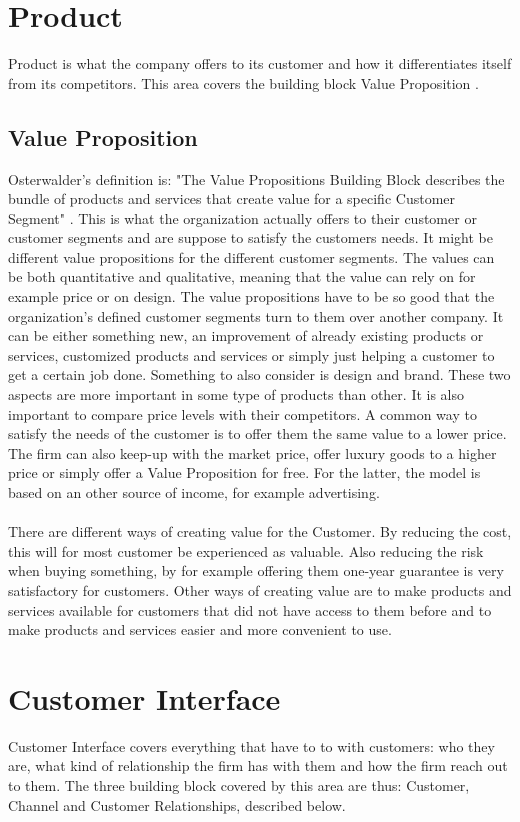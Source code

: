 \newpage
\section{Product}
Product is what the company offers to its customer and how it differentiates itself from its competitors. This area covers the building block Value Proposition \cite{osterwalderthesis}.

\subsection{Value Proposition}
Osterwalder's definition is: "The Value Propositions Building Block describes the bundle of products and services that create value for a specific Customer Segment" \cite{osterwalder}. This is what the organization actually offers to their customer or customer segments and are suppose to satisfy the customers needs. It might be different value propositions for the different customer segments. The values can be both quantitative and qualitative, meaning that the value can rely on for example price or on design. The value propositions have to be so good that the organization's defined customer segments turn to them over another company. It can be either something new, an improvement of already existing products or services, customized products and services or simply just helping a customer to get a certain job done. Something to also consider is design and brand. These two aspects are more important in some type of products than other. It is also important to compare price levels with their competitors. A common way to satisfy the needs of the customer is to offer them the same value to a lower price. The firm can also keep-up with the market price, offer luxury goods to a higher price or simply offer a Value Proposition for free. For the latter, the model is based on an other source of income, for example advertising. \\ \\
There are different ways of creating value for the Customer. By reducing the cost, this will for most customer be experienced as valuable. Also reducing the risk when buying something, by for example offering them one-year guarantee is very satisfactory for customers. Other ways of creating value are to make products and services available for customers that did not have access to them before and to make products and services easier and more convenient to use. \cite{osterwalder}


\section{Customer Interface}
Customer Interface covers everything that have to to with customers: who they are, what kind of relationship the firm has with them and how the firm reach out to them. The three building block covered by this area are thus: Customer, Channel and Customer Relationships, described below. \cite{osterwalderthesis}

